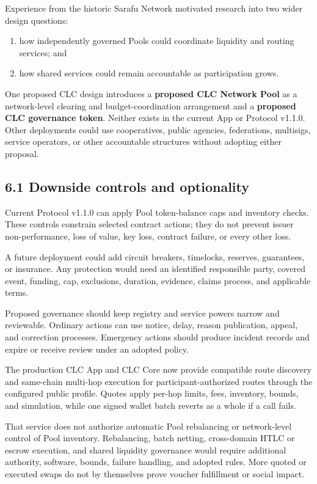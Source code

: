 \documentclass[11pt]{article}
\begin{document}
Experience from the historic Sarafu Network motivated research into two wider design questions:

\begin{enumerate}[leftmargin=*]
\item how independently governed Pools could coordinate liquidity and routing services; and
\item how shared services could remain accountable as participation grows.
\end{enumerate}
One proposed CLC design introduces a \textbf{proposed CLC Network Pool} as a network-level clearing and budget-coordination arrangement and a \textbf{proposed CLC governance token}. Neither exists in the current App or Protocol v1.1.0. Other deployments could use cooperatives, public agencies, federations, multisigs, service operators, or other accountable structures without adopting either proposal.

\subsection*{6.1 Downside controls and optionality}

Current Protocol v1.1.0 can apply Pool token-balance caps and inventory checks. These controls constrain selected contract actions; they do not prevent issuer non-performance, loss of value, key loss, contract failure, or every other loss.

A future deployment could add circuit breakers, timelocks, reserves, guarantees, or insurance. Any protection would need an identified responsible party, covered event, funding, cap, exclusions, duration, evidence, claims process, and applicable terms.

Proposed governance should keep registry and service powers narrow and reviewable. Ordinary actions can use notice, delay, reason publication, appeal, and correction processes. Emergency actions should produce incident records and expire or receive review under an adopted policy.

The production CLC App and CLC Core now provide compatible route discovery and same-chain multi-hop execution for participant-authorized routes through the configured public profile. Quotes apply per-hop limits, fees, inventory, bounds, and simulation, while one signed wallet batch reverts as a whole if a call fails.

That service does not authorize automatic Pool rebalancing or network-level control of Pool inventory. Rebalancing, batch netting, cross-domain HTLC or escrow execution, and shared liquidity governance would require additional authority, software, bounds, failure handling, and adopted rules. More quoted or executed swaps do not by themselves prove voucher fulfillment or social impact.
\end{document}
